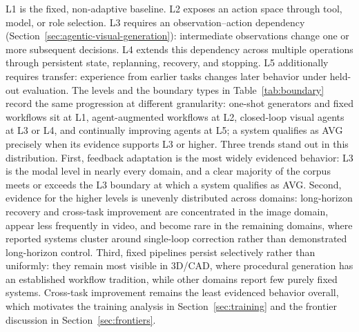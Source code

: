 L1 is the fixed, non-adaptive baseline. L2 exposes an action space through tool, model, or role selection. L3 requires an observation--action dependency (Section~\ref{sec:agentic-visual-generation}): intermediate observations change one or more subsequent decisions. L4 extends this dependency across multiple operations through persistent state, replanning, recovery, and stopping. L5 additionally requires transfer: experience from earlier tasks changes later behavior under held-out evaluation. The levels and the boundary types in Table~\ref{tab:boundary} record the same progression at different granularity: one-shot generators and fixed workflows sit at L1, agent-augmented workflows at L2, closed-loop visual agents at L3 or L4, and continually improving agents at L5; a system qualifies as AVG precisely when its evidence supports L3 or higher. 
Three trends stand out in this distribution. First, feedback adaptation is the most widely evidenced behavior: L3 is the modal level in nearly every domain, and a clear majority of the corpus meets or exceeds the L3 boundary at which a system qualifies as AVG. Second, evidence for the higher levels is unevenly distributed across domains: long-horizon recovery and cross-task improvement are concentrated in the image domain, appear less frequently in video, and become rare in the remaining domains, where reported systems cluster around single-loop correction rather than demonstrated long-horizon control. Third, fixed pipelines persist selectively rather than uniformly: they remain most visible in 3D/CAD, where procedural generation has an established workflow tradition, while other domains report few purely fixed systems. Cross-task improvement remains the least evidenced behavior overall, which motivates the training analysis in Section~\ref{sec:training} and the frontier discussion in Section~\ref{sec:frontiers}.



